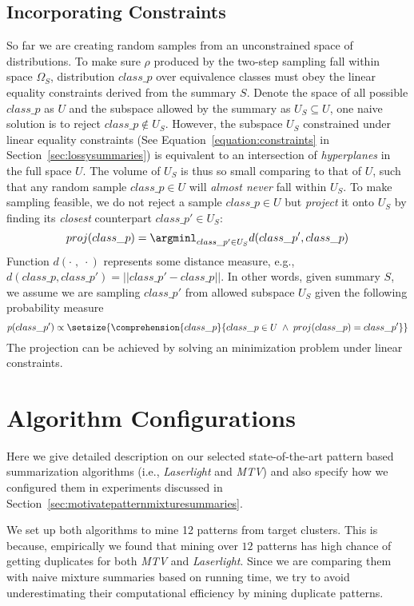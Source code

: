 \subsection{Incorporating Constraints}
So far we are creating random samples from an unconstrained space of distributions. 
To make sure $\rho$ produced by the two-step sampling fall within space $\Omega_S$, distribution $class\_p$ over equivalence classes must obey the linear equality constraints derived from the summary $S$.
Denote the space of all possible $class\_p$ as $U$ and the subspace allowed by the summary as $U_S\subseteq U$, one naive solution is to reject $class\_p\notin U_S$. 
However, the subspace $U_S$ constrained under linear equality constraints (See Equation~\ref{equation:constraints} in Section~\ref{sec:lossysummaries}) is equivalent to an intersection of \textit{hyperplanes} in the full space $U$. 
The volume of $U_S$ is thus so small comparing to that of $U$, such that any random sample $class\_p\in U$ will \textit{almost never} fall within $U_S$.
To make sampling feasible, we do not reject a sample $class\_p\in U$ but \textit{project} it onto $U_S$ by finding its \textit{closest} counterpart $class\_p'\in U_S$:
$$proj(class\_p)=\argminl_{class\_p'\in U_S}d(class\_p',class\_p)$$
Function $d(\cdot\; , \;\cdot)$ represents some distance measure, e.g., $d(class\_p,class\_p')=||class\_p'-class\_p||$. 
In other words, given summary $S$, we assume we are sampling $class\_p'$ from allowed subspace $U_S$ given the following probability measure $$p(class\_p')\propto\setsize{\comprehension{class\_p}{class\_p\in U\;\wedge\;proj(class\_p)=class\_p'}}$$
The projection can be achieved by solving an minimization problem under linear constraints.

\section{Algorithm Configurations}
\label{appendix:experimentsettingsforpatternbasedalgorithms}
Here we give detailed description on our selected state-of-the-art pattern based summarization algorithms (i.e., \textit{Laserlight} and \textit{MTV}) and also specify how we configured them in experiments discussed in Section~\ref{sec:motivatepatternmixturesummaries}. 

We set up both algorithms to mine 12 patterns from target clusters.
This is because, empirically we found that mining over $12$ patterns has high chance of getting duplicates for both \textit{MTV} and \textit{Laserlight}. 
Since we are comparing them with naive mixture summaries based on running time, we try to avoid underestimating their computational efficiency by mining duplicate patterns.

